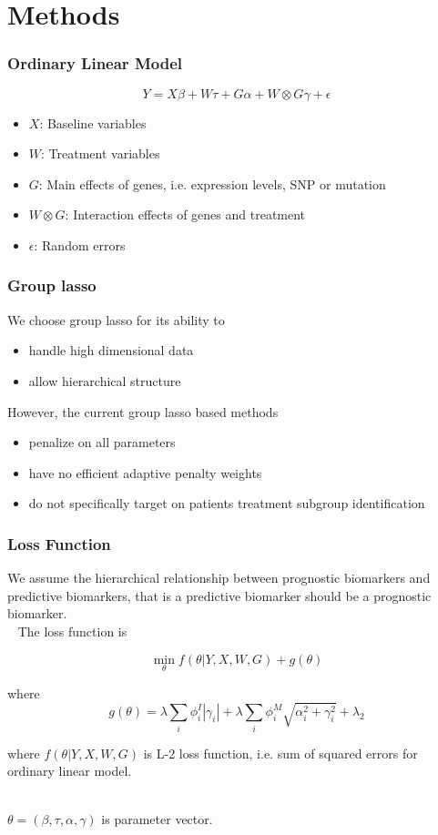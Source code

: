 \documentclass{beamer}
\begin{document}
\section{Methods}

\begin{frame}
\frametitle{Ordinary Linear Model}

$$Y=X\beta + W\tau + G\alpha + W\otimes G \gamma+\epsilon$$

\begin{itemize}
    \item $X$: Baseline variables
    \item $W$: Treatment variables
    \item $G$: Main effects of genes, i.e. expression levels, SNP or mutation
    \item $W\otimes G$: Interaction effects of genes and treatment
    \item $\epsilon$: Random errors
\end{itemize}
\end{frame}

\begin{frame}
\frametitle{Group lasso}

We choose group lasso for its ability to 

\begin{itemize}
    \item handle high dimensional data
    \item allow hierarchical structure
\end{itemize}

However, the current group lasso based methods

\begin{itemize}
    \item penalize on all parameters
    \item have no efficient adaptive penalty weights
    \item do not specifically target on patients treatment subgroup identification
\end{itemize}

\end{frame}

\begin{frame}
\frametitle{Loss Function}

We assume the hierarchical relationship between prognostic biomarkers and predictive biomarkers, 
that is a predictive biomarker should be a prognostic biomarker.\\~
The loss function is

$$\min_{\theta} f(\theta|Y,X,W,G)+ g(\theta)$$

 where $$ g(\theta)=\lambda \sum_i \phi_i^I |\gamma_i| + \lambda \sum_i \phi_i^M \sqrt{\alpha_i^2 + \gamma_i^2}+\lambda_2$$

where $f(\theta|Y,X,W,G)$ is L-2 loss function, i.e. sum of squared errors for ordinary linear model.\\~

$\theta=(\beta, \tau, \alpha, \gamma)$ is parameter vector.



\end{frame}
\end{document}
